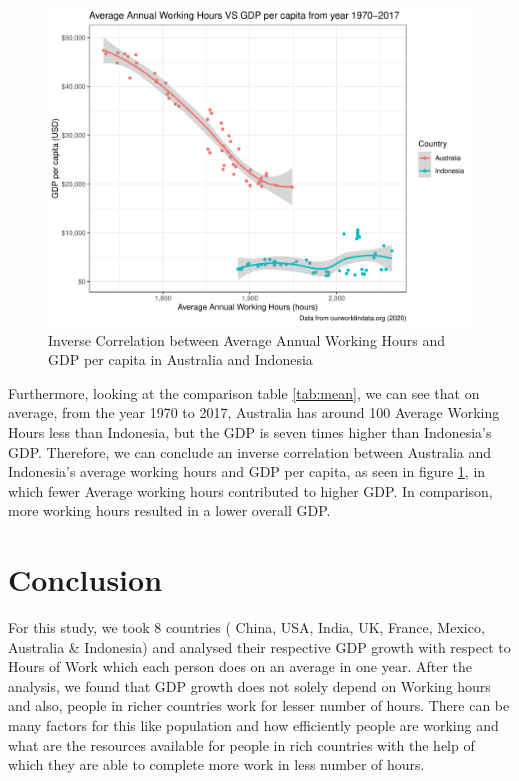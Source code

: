 \documentclass[11pt,a4paper,]{article}
\begin{document}
\clearpage

\begin{figure}
\centering
\includegraphics{report_files/figure-latex/scatter-1.pdf}
\caption{\label{fig:scatter}Inverse Correlation between Average Annual Working Hours and GDP per capita in Australia and Indonesia}
\end{figure}

Furthermore, looking at the comparison table \ref{tab:mean}, we can see that on average, from the year 1970 to 2017, Australia has around 100 Average Working Hours less than Indonesia, but the GDP is seven times higher than Indonesia's GDP. Therefore, we can conclude an inverse correlation between Australia and Indonesia's average working hours and GDP per capita, as seen in figure \ref{fig:scatter}, in which fewer Average working hours contributed to higher GDP. In comparison, more working hours resulted in a lower overall GDP.

\clearpage

\hypertarget{conclusion}{%
\section{Conclusion}\label{conclusion}}

For this study, we took 8 countries ( China, USA, India, UK, France, Mexico, Australia \& Indonesia) and analysed their respective GDP growth with respect to Hours of Work which each person does on an average in one year. After the analysis, we found that GDP growth does not solely depend on Working hours and also, people in richer countries work for lesser number of hours. There can be many factors for this like population and how efficiently people are working and what are the resources available for people in rich countries with the help of which they are able to complete more work in less number of hours.

\printbibliography
\end{document}
